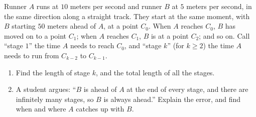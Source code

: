 Runner $A$ runs at $10$ meters per second and runner $B$ at $5$ meters per second, in the same direction along a straight track. They start at the same moment, with $B$ starting $50$ meters ahead of $A$, at a point $C_0$. When $A$ reaches $C_0$, $B$ has moved on to a point $C_1$; when $A$ reaches $C_1$, $B$ is at a point $C_2$; and so on. Call ``stage $1$'' the time $A$ needs to reach $C_0$, and ``stage $k$'' (for $k\ge2$) the time $A$ needs to run from $C_{k-2}$ to $C_{k-1}$.
\begin{enumerate}
\item[(a)] Find the length of stage $k$, and the total length of all the stages.
\item[(b)] A student argues: ``$B$ is ahead of $A$ at the end of every stage, and there are infinitely many stages, so $B$ is always ahead.'' Explain the error, and find when and where $A$ catches up with $B$.
\end{enumerate}
